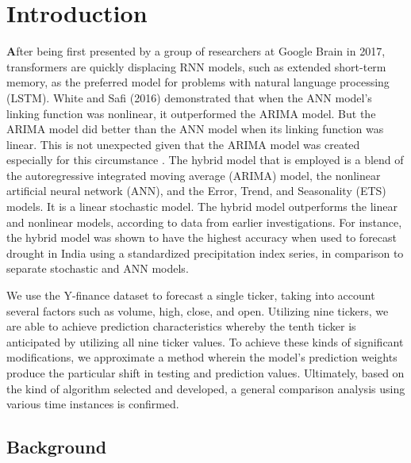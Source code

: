 \chapter{Introduction}
\label{ch:into} %

\textbf 

After being first presented by a group of researchers at Google Brain in 2017, transformers are 
quickly displacing RNN models, such as extended short-term memory, as the preferred model for 
problems with natural language processing (LSTM). White and Safi (2016) demonstrated that when 
the ANN model's linking function was nonlinear, it outperformed the ARIMA model. But the ARIMA 
model did better than the ANN model when its linking function was linear. This is not 
unexpected given that the ARIMA model was created especially for this circumstance 
\cite{safi2021hybrid}. The hybrid model that is employed is a blend of the autoregressive 
integrated moving average (ARIMA) model, the nonlinear artificial neural network (ANN), and the 
Error, Trend, and Seasonality (ETS) models. It is a linear stochastic model. The hybrid model 
outperforms the linear and nonlinear models, according to data from earlier investigations. For 
instance, the hybrid model was shown to have the highest accuracy when used to forecast drought 
in India using a standardized precipitation index series, in comparison to separate stochastic 
and ANN models.

We use the Y-finance dataset to forecast a single ticker, taking into account several factors 
such as volume, high, close, and open. Utilizing nine tickers, we are able to achieve 
prediction characteristics whereby the tenth ticker is anticipated by utilizing all nine ticker 
values. To achieve these kinds of significant modifications, we approximate a method wherein 
the model's prediction weights produce the particular shift in testing and prediction values. 
Ultimately, based on the kind of algorithm selected and developed, a general comparison 
analysis using various time instances is confirmed. 

\section{Background}
\label{sec:into_back}


